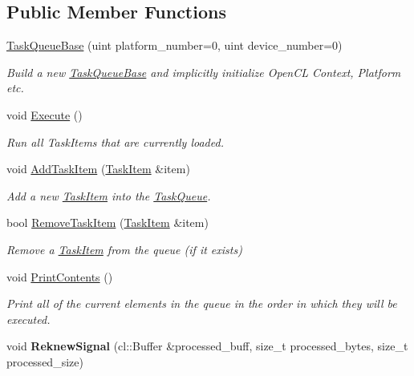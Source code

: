 \subsection*{Public Member Functions}
\begin{DoxyCompactItemize}
\item 
\hyperlink{classjaspl_1_1ocl_1_1_task_queue_base_a6568c5c6bd8b3d2e2ad3c13eef6fb31b}{Task\+Queue\+Base} (uint platform\+\_\+number=0, uint device\+\_\+number=0)
\begin{DoxyCompactList}\small\item\em Build a new \hyperlink{classjaspl_1_1ocl_1_1_task_queue_base}{Task\+Queue\+Base} and implicitly initialize Open\+CL Context, Platform etc. \end{DoxyCompactList}\item 
void \hyperlink{classjaspl_1_1ocl_1_1_task_queue_base_af9671abc7d62d895bb6abdd9c68bb31c}{Execute} ()
\begin{DoxyCompactList}\small\item\em Run all Task\+Items that are currently loaded. \end{DoxyCompactList}\item 
void \hyperlink{classjaspl_1_1ocl_1_1_task_queue_base_aa71fb29536edbed03a771e40b81ea741}{Add\+Task\+Item} (\hyperlink{classjaspl_1_1ocl_1_1_task_item}{Task\+Item} \&item)
\begin{DoxyCompactList}\small\item\em Add a new \hyperlink{classjaspl_1_1ocl_1_1_task_item}{Task\+Item} into the \hyperlink{classjaspl_1_1ocl_1_1_task_queue}{Task\+Queue}. \end{DoxyCompactList}\item 
bool \hyperlink{classjaspl_1_1ocl_1_1_task_queue_base_a6415d52d4baca7807b251a6534f16b69}{Remove\+Task\+Item} (\hyperlink{classjaspl_1_1ocl_1_1_task_item}{Task\+Item} \&item)
\begin{DoxyCompactList}\small\item\em Remove a \hyperlink{classjaspl_1_1ocl_1_1_task_item}{Task\+Item} from the queue (if it exists) \end{DoxyCompactList}\item 
void \hyperlink{classjaspl_1_1ocl_1_1_task_queue_base_ac548bc47ba629093eb10c3566cb55d22}{Print\+Contents} ()\hypertarget{classjaspl_1_1ocl_1_1_task_queue_base_ac548bc47ba629093eb10c3566cb55d22}{}\label{classjaspl_1_1ocl_1_1_task_queue_base_ac548bc47ba629093eb10c3566cb55d22}

\begin{DoxyCompactList}\small\item\em Print all of the current elements in the queue in the order in which they will be executed. \end{DoxyCompactList}\item 
void {\bfseries Reknew\+Signal} (cl\+::\+Buffer \&processed\+\_\+buff, size\+\_\+t processed\+\_\+bytes, size\+\_\+t processed\+\_\+size)\hypertarget{classjaspl_1_1ocl_1_1_task_queue_base_a106853a7c3e48b1446013f6769e67a8a}{}\label{classjaspl_1_1ocl_1_1_task_queue_base_a106853a7c3e48b1446013f6769e67a8a}

\end{DoxyCompactItemize}
